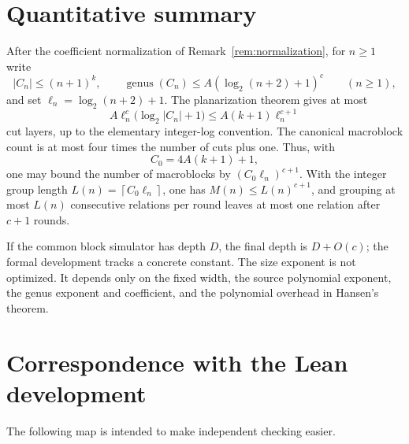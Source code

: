 \documentclass[11pt]{article}
\theoremstyle{definition}
\newcommand{\genus}{\operatorname{genus}}
\newcommand{\ceil}[1]{\left\lceil #1\right\rceil}
\begin{document}
\section{Quantitative summary}\label{sec:quant}

After the coefficient normalization of Remark~\ref{rem:normalization}, for $n\ge1$ write
\[
  |C_n|\le(n+1)^k,
  \qquad
  \genus(C_n)\le A(\log_2(n+2)+1)^c
  \qquad (n\ge1),
\]
and set $\ell_n=\log_2(n+2)+1$.  The planarization theorem gives at most
\[
  A\ell_n^c\bigl(\log_2 |C_n|+1\bigr)
  \le A(k+1)\ell_n^{c+1}
\]
cut layers, up to the elementary integer-log convention.  The canonical
macroblock count is at most four times the number of cuts plus one.  Thus, with
\[
  C_0=4A(k+1)+1,
\]
one may bound the number of macroblocks by $(C_0\ell_n)^{c+1}$.
With the integer group length $L(n)=\ceil{C_0\ell_n}$, one has
$M(n)\le L(n)^{c+1}$, and grouping at most $L(n)$ consecutive relations per
round leaves at most one relation after $c+1$ rounds.

If the common block simulator has depth $D$, the final depth is
$D+O(c)$; the formal development tracks a concrete constant.  The size
exponent is not optimized.  It depends only on the fixed width, the source
polynomial exponent, the genus exponent and coefficient, and the polynomial
overhead in Hansen's theorem.

\section{Correspondence with the Lean development}\label{sec:map}

The following map is intended to make independent checking easier.
\end{document}
